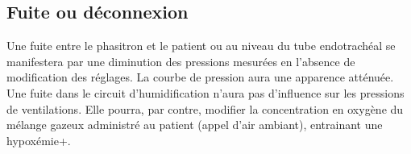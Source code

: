 \subsection{Fuite ou déconnexion}

Une fuite entre le phasitron et le patient ou au niveau du tube endotrachéal se
manifestera par une diminution des pressions mesurées en l’absence de
modification des réglages. La courbe de pression aura une apparence atténuée.
Une fuite dans le circuit d’humidification n’aura pas d’influence sur les
pressions de ventilations. Elle pourra, par contre, modifier la concentration
en oxygène du mélange gazeux administré au patient (appel d’air ambiant),
entrainant une hypoxémie+.
